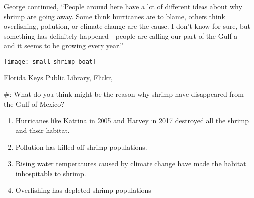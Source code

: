 \documentclass[t]{beamer}
\newcommand*{\cq}[1]{%
	\#{\lining#1}:%
}
\begin{document}
\begin{frame}

	\begin{multicols}{2}
	
	George continued, “People around here have a lot of different 
	ideas about why shrimp are going away. Some think hurricanes 
	are to blame, others think overfishing, pollution, or 
	climate change are the cause.  I don’t know for sure, but something 
	has definitely happened—people are calling our part of the Gulf a 
	—and it seems to be growing every year.”
	\columnbreak
	
		{\centering\texttt{[image: small\_shrimp\_boat]}\par
		}
	\end{multicols}
	
	\vfilll
	
	\hfill \tiny Florida Keys Public Library, Flickr, 
\end{frame}
%
\begin{frame}[t]{\cq{1} What do you think might be the reason why shrimp have disappeared from the Gulf of Mexico?}

	\begin{enumerate}
		\item Hurricanes like Katrina in 2005 and Harvey in 2017 destroyed all the shrimp and their habitat.
		
		\item Pollution has killed off shrimp populations.
		
		\item Rising water temperatures caused by climate change have made the habitat inhospitable to shrimp.
		
		\item Overfishing has depleted shrimp populations. 
	\end{enumerate}
\end{frame}
%
%
%		
%		
%		
%		
%
%
\end{document}
